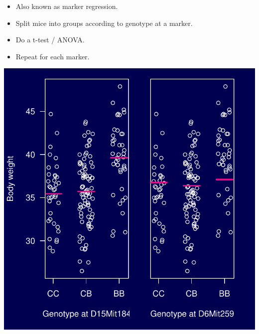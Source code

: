\documentclass[12pt]{article}
\newcommand{\smallsize}{\fontsize{25}{30} \selectfont}
\newcommand{\smallersize}{\fontsize{20}{25} \selectfont}
\begin{document}
\vspace{2cm}

\color{mywhite} \smallsize

\hspace*{0.5in}
\begin{minipage}[t]{4.1in}
\vspace*{5mm}

\sloppy
\smallersize
\begin{itemize}
\setlength{\rightskip}{0pt plus 1fil} %
\item Also known as {\color{mypink} marker regression}.
\item Split mice into groups according to genotype at a marker.
\item Do a t-test / ANOVA.
\item Repeat for each marker.
\end{itemize}
\end{minipage}
\hfill
\begin{minipage}[t]{5.3in}
\vspace*{0mm}

\includegraphics{Figs/anova.pdf}
\end{minipage}
\end{document}
